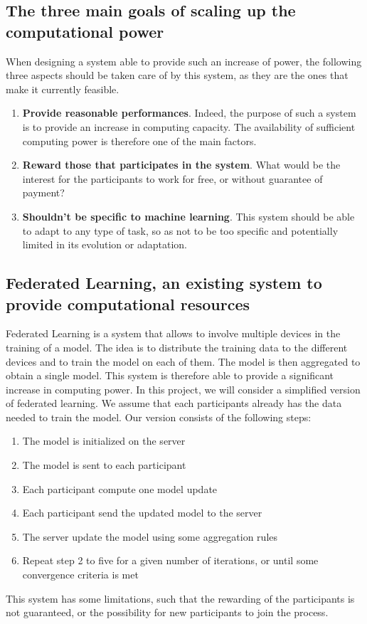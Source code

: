 \documentclass{article}
\begin{document}
\subsection{The three main goals of scaling up the computational power}
When designing a system able to provide such an increase of power, the following three aspects should be taken care of
by this system, as they are the ones that make it currently feasible.
\begin{enumerate}
    \item \textbf{Provide reasonable performances}. Indeed, the purpose of such a system is to provide an increase in computing
     capacity. The availability of sufficient computing power is therefore one of the main factors.
    \item \textbf{Reward those that participates in the system}. What would be the interest for the participants to work for
     free, or without guarantee of payment?
    \item \textbf{Shouldn't be specific to machine learning}. This system should be able to adapt to any type of task, so as not
     to be too specific and potentially limited in its evolution or adaptation.
\end{enumerate}

\subsection{Federated Learning, an existing system to provide computational resources}
Federated Learning is a system that allows to involve multiple devices in the training of a model. The idea is to
distribute the training data to the different devices and to train the model on each of them. The model is then
aggregated to obtain a single model. This system is therefore able to provide a significant increase in computing power.
In this project, we will consider a simplified version of federated learning. We assume that each participants
already has the data needed to train the model. Our version consists of the following steps:
\begin{enumerate}
    \item The model is initialized on the server
    \item The model is sent to each participant
    \item Each participant compute one model update
    \item Each participant send the updated model to the server
    \item The server update the model using some aggregation rules
    \item Repeat step 2 to five for a given number of iterations, or until some convergence criteria is met
\end{enumerate}
This system has some limitations, such that the rewarding of the participants is not guaranteed, or the possibility for
new participants to join the process.
\end{document}

